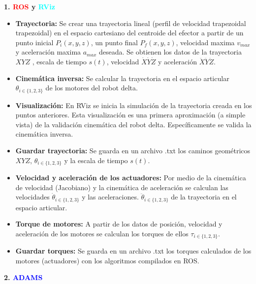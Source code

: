         \item \textbf{1. \textcolor{red}{ROS} y \textcolor{cyan}{RViz}}
            \begin{itemize}
                \item {\textbf{Trayectoria:} Se crear una  trayectoria lineal (perfil de velocidad trapezoidal trapezoidal) en el espacio cartesiano del centroide del efector a partir de un punto inicial $P_i(x,y,z)$, un punto final $P_f(x,y,z)$, velocidad maxima $v_{max}$ y aceleración maxima $a_{max}$ deseada. Se obtienen los datos de la trayectoria $XYZ$ , escala de tiempo $s(t)$, velocidad $\dot{X}\dot{Y}\dot{Z}$ y aceleración $\ddot{X}\ddot{Y}\ddot{Z}$.}
                \item {\textbf{Cinemática inversa:} Se calcular la trayectoria en el espacio articular $\theta_{i\in\{1,2,3\}}$ de los motores del robot delta.}
                \item {\textbf{Visualización:} En RViz se inicia la simulación de la trayectoria creada en los puntos anteriores. Esta visualización es una primera aproximación (a simple vista) de la validación cinemática del robot delta. Específicamente se valida la cinemática inversa.}
                \item {\textbf{Guardar trayectoria:} Se guarda en un archivo .txt los caminos geométricos  $XYZ$, $\theta_{i\in\{1,2,3\}}$ y la escala de tiempo $s(t)$.
                }
                \item {\textbf{Velocidad y aceleración de los actuadores:} Por medio de la cinemática de velocidad (Jacobiano) y la cinemática de aceleración se calculan las velocidades $\dot{\theta}_{i\in\{1,2,3\}}$ y las aceleraciones. $\ddot{\theta}_{i\in\{1,2,3\}}$ de la trayectoria en el espacio articular.}
                \item{ \textbf{Torque de motores:} A partir de los datos de posición, velocidad y aceleración de los motores se calculan los torques de ellos $\tau_{i\in\{1,2,3\}}$.}
                \item {\textbf{Guardar torques:} Se guarda en un archivo .txt los torques calculados de los motores (actuadores) con los algoritmos compilados en ROS.
                }
            \end{itemize}
        \item \textbf{2. \textcolor{blue}{ADAMS}}
